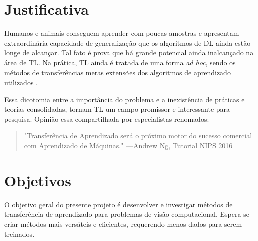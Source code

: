 \documentclass[
12pt, %
a4paper, %
onecolumn, %
]{article}
\begin{document}

\section{Justificativa}
Humanos e animais conseguem aprender com poucas amostras \cite{goodfellow} e apresentam extraordinária capacidade de generalização que os algoritmos de DL ainda estão longe de alcançar. Tal fato é prova que há grande potencial ainda inalcançado na área de TL. Na prática, TL ainda é tratada de uma forma \textit{ad hoc}, sendo os métodos de transferências meras extensões dos algoritmos de aprendizado utilizados \cite{torrey}.

Essa dicotomia entre a importância do problema e a inexistência de práticas e teorias consolidadas, tornam TL um campo promissor e interessante para pesquisa.  Opinião essa compartilhada por especialistas renomados:
\begin{quote} "Transferência de Aprendizado será o próximo motor do sucesso comercial com Aprendizado de Máquinas." \hfill ---Andrew Ng, Tutorial NIPS 2016 \cite{ANg}
\end{quote}





\section{Objetivos}

O objetivo geral do presente projeto é desenvolver e investigar métodos de transferência de aprendizado para problemas de visão computacional. Espera-se criar métodos mais versáteis e eficientes, requerendo menos dados para serem treinados.
\end{document}
